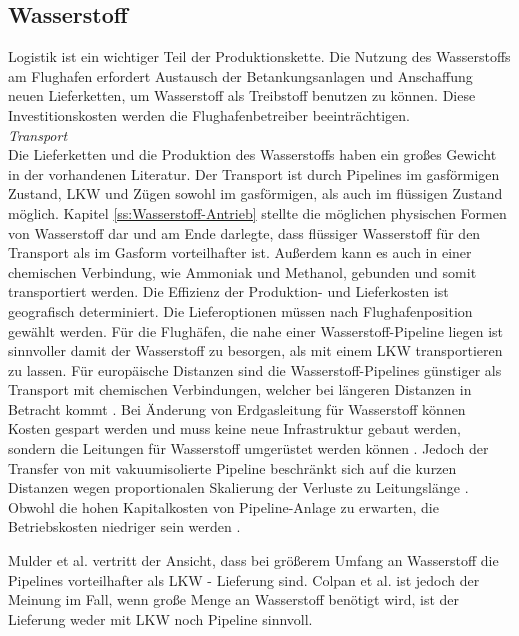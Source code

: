 \subsection{Wasserstoff}
Logistik ist ein wichtiger Teil der Produktionskette. 
Die Nutzung des Wasserstoffs am Flughafen erfordert Austausch der Betankungsanlagen und Anschaffung neuen Lieferketten, 
um Wasserstoff als Treibstoff benutzen zu können. Diese Investitionskosten werden die Flughafenbetreiber beeinträchtigen. \\
\textit{Transport}\\
Die Lieferketten und die Produktion des Wasserstoffs haben ein großes Gewicht in der vorhandenen Literatur.
Der Transport ist durch Pipelines im gasförmigen Zustand, LKW und Zügen sowohl im gasförmigen, als auch im flüssigen Zustand möglich. 
Kapitel \ref{ss:Wasserstoff-Antrieb} stellte die möglichen physischen Formen von Wasserstoff dar und am Ende darlegte,
dass flüssiger Wasserstoff für den Transport als im Gasform vorteilhafter ist. 
Außerdem kann es auch in einer chemischen Verbindung, wie Ammoniak und Methanol, gebunden und somit transportiert werden.
%
%
%
% 
Die Effizienz der Produktion- und Lieferkosten ist geografisch determiniert. 
Die Lieferoptionen müssen nach Flughafenposition gewählt werden. Für die Flughäfen, die nahe einer Wasserstoff-Pipeline liegen ist sinnvoller
damit der Wasserstoff zu besorgen, als mit einem LKW transportieren zu lassen.
%
Für europäische Distanzen sind die Wasserstoff-Pipelines günstiger als Transport mit chemischen Verbindungen, 
welcher bei längeren Distanzen in Betracht kommt \cite{undertaking2022strategic}. 
Bei Änderung von Erdgasleitung für Wasserstoff können Kosten gespart
werden und muss keine neue Infrastruktur gebaut werden, sondern die Leitungen für Wasserstoff umgerüstet werden können \cite{undertaking2022strategic}.
%
Jedoch der Transfer von  mit vakuumisolierte Pipeline beschränkt sich auf die kurzen Distanzen
wegen proportionalen Skalierung der Verluste zu Leitungslänge \cite{colpan2022fuel}.
Obwohl die hohen Kapitalkosten von Pipeline-Anlage zu erwarten, die Betriebskosten niedriger sein werden \cite{mulder2019outlook}.

Mulder et al. \cite{mulder2019outlook} vertritt der Ansicht, dass bei größerem Umfang an Wasserstoff die Pipelines 
vorteilhafter als LKW - Lieferung sind. 
Colpan et al.\cite{colpan2022fuel} ist jedoch der Meinung im Fall, wenn große Menge an Wasserstoff benötigt wird, 
ist der Lieferung weder mit LKW noch Pipeline sinnvoll. 

